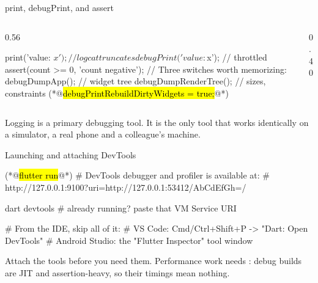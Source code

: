 \documentclass[10pt,aspectratio=169,t]{beamer}
\begin{document}
\begin{frame}[fragile,eyebrow=Debugging]{print, debugPrint, and assert}
  \begin{columns}[T]
    \begin{column}{0.56\textwidth}
\begin{dart}
print('value: $x');  // logcat truncates
debugPrint('value: $x'); // throttled
assert(count >= 0, 'count negative');
// Three switches worth memorizing:
debugDumpApp();         // widget tree
debugDumpRenderTree(); // sizes, constraints
(*@\hl{debugPrintRebuildDirtyWidgets = true;}@*)
\end{dart}
    \end{column}
    \begin{column}{0.40\textwidth}
    \end{column}
  \end{columns}
  \begin{takeaway}{Logging is a primary debugging tool.}
    It is the only tool that works identically on a simulator, a real phone and a colleague's machine.
  \end{takeaway}
\end{frame}

\begin{frame}[fragile,eyebrow=Debugging]{Launching and attaching DevTools}
\begin{shell}
(*@\hl{flutter run}@*)
#   DevTools debugger and profiler is available at:
#   http://127.0.0.1:9100?uri=http://127.0.0.1:53412/AbCdEfGh=/

dart devtools   # already running? paste that VM Service URI

# From the IDE, skip all of it:
#   VS Code:        Cmd/Ctrl+Shift+P -> "Dart: Open DevTools"
#   Android Studio: the "Flutter Inspector" tool window
\end{shell}
  \begin{takeaway}{Attach the tools before you need them.}
    Performance work needs : debug builds are JIT and assertion-heavy, so their timings mean nothing.
  \end{takeaway}
\end{frame}
\end{document}
